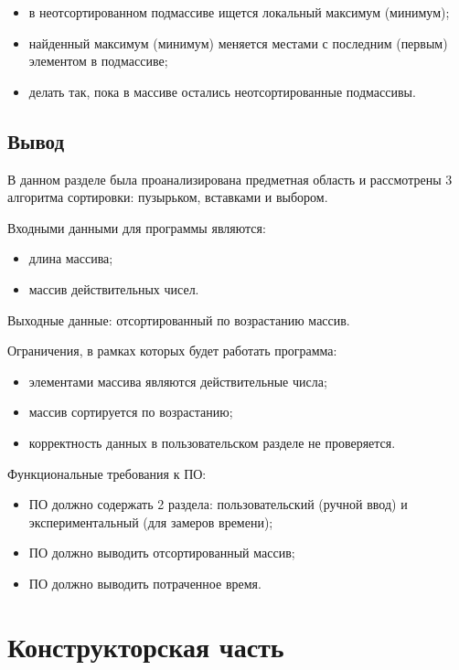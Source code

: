 \documentclass[12pt]{report}
\begin{document}
	\begin{itemize}
		\item в неотсортированном подмассиве ищется локальный максимум (минимум);
		\item найденный максимум (минимум) меняется местами с последним (первым) элементом в подмассиве;
		\item делать так, пока в массиве остались неотсортированные подмассивы.
	\end{itemize}
	
	\section{Вывод}
	В данном разделе была проанализирована предметная область и рассмотрены 3 алгоритма сортировки: пузырьком, вставками и выбором.
	
	Входными данными для программы являются:
	
	\begin{itemize}
		\item длина массива;
		\item массив действительных чисел.
	\end{itemize}
	
	Выходные данные: отсортированный по возрастанию массив.
	
	Ограничения, в рамках которых будет работать программа:
	
	\begin{itemize}
		\item элементами массива являются действительные числа;
		\item массив сортируется по возрастанию;
		\item корректность данных в пользовательском разделе не проверяется.
	\end{itemize}
	
	Функциональные требования к ПО:
	
	\begin{itemize}
		\item ПО должно содержать 2 раздела: пользовательский (ручной ввод) и экспериментальный (для замеров времени);
		\item ПО должно выводить отсортированный массив;
		\item ПО должно выводить потраченное время.
	\end{itemize}
	
	\clearpage
	
	\chapter{Конструкторская часть}
	
\end{document}
